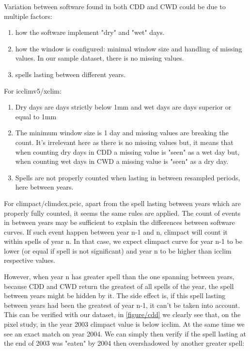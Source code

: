 \documentclass[a4paper,11pt]{article}
\begin{document}
    Variation between software found in both CDD and CWD could be due to multiple factors:
    \begin{enumerate}
    \item how the software implement "dry" and "wet" days.
    \item how the window is configured: minimal window size and handling of missing values. In our sample dataset, there is no missing values.
    \item spells lasting between different years.
    \end{enumerate}

    For icclimv5/xclim:
    \begin{enumerate}
        \item Dry days are days strictly below 1mm and wet days are days superior or equal to 1mm
        \item The minimum window size is 1 day and missing values are breaking the count. 
              It's irrelevant here as there is no missing values but, it means that when counting dry days in CDD a missing value is "seen" as a wet day but, when counting wet days in CWD a missing value is "seen" as a dry day.
        \item Spells are not properly counted when lasting in between resampled periods, here between years.
    \end{enumerate}

    For climpact/climdex.pcic, apart from the spell lasting between years which are properly fully counted, it seems the same rules are applied.
    The count of events in between years may be sufficient to explain the differences between software curves.
    If such event happen between year n-1 and n, climpact will count it within spells of year n.
    In that case, we expect climpact curve for year n-1 to be lower (or equal if spell is not significant) and year n to be higher than icclim respective values.
    
    However, when year n has greater spell than the one spanning between years, because CDD and CWD return the greatest of all spells of the year, the spell between years
    might be hidden by it. The side effect is, if this spell lasting between years had been the greatest of year n-1, it can't be taken into account.
    This can be verified with our dataset, in \ref{figure/cdd} we clearly see that, on the pixel study, in the year 2003 climpact value is below icclim.
    At the same time we see an exact match on year 2004.
    We can simply then verify if the spell lasting at the end of 2003 was "eaten" by 2004 then overshadowed by another greater spell:
    
\end{document}
